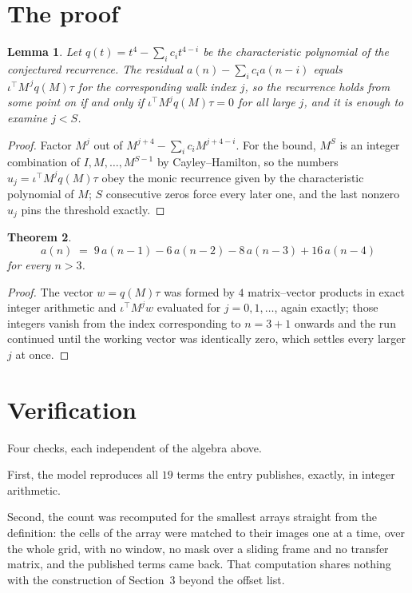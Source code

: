 \documentclass[11pt,a4paper]{article}
\theoremstyle{plain}
\newtheorem{theorem}{Theorem}
\newtheorem{lemma}[theorem]{Lemma}
\theoremstyle{definition}
\begin{document}
\section{The proof}

\begin{lemma}\label{lem:crit}
Let $q(t)=t^{4}-\sum_i c_it^{4-i}$ be the characteristic polynomial of the
conjectured recurrence. The residual $a(n)-\sum_ic_ia(n-i)$ equals
$\iota^{\!\top}M^{\,j}q(M)\tau$ for the corresponding walk index $j$, so the recurrence
holds from some point on if and only if $\iota^{\!\top}M^{j}q(M)\tau=0$ for all large $j$,
and it is enough to examine $j<S$.
\end{lemma}

\begin{proof}
Factor $M^{j}$ out of $M^{j+4}-\sum_ic_iM^{j+4-i}$. For the bound, $M^{S}$
is an integer combination of $I,M,\dots,M^{S-1}$ by Cayley--Hamilton, so the numbers
$u_j=\iota^{\!\top}M^{j}q(M)\tau$ obey the monic recurrence given by the characteristic
polynomial of $M$; $S$ consecutive zeros force every later one, and the last nonzero $u_j$
pins the threshold exactly.
\end{proof}

\begin{theorem}
\[
a(n)\;=\;9\,a(n-1) - 6\,a(n-2) - 8\,a(n-3) + 16\,a(n-4)
\]
for every $n>3$.
\end{theorem}

\begin{proof}
The vector $w=q(M)\tau$ was formed by $4$ matrix--vector products in exact integer
arithmetic and $\iota^{\!\top}M^{j}w$ evaluated for $j=0,1,\dots$, again exactly; those
integers vanish from the index corresponding to $n=3+1$ onwards and the run continued
until the working vector was identically zero, which settles every larger $j$ at once.
\end{proof}

\section{Verification}

Four checks, each independent of the algebra above.

First, the model reproduces all $19$ terms the entry publishes, exactly, in integer
arithmetic.

Second, the count was recomputed for the smallest arrays straight from the definition: the
cells of the array were matched to their images one at a time, over the whole grid, with no
window, no mask over a sliding frame and no transfer matrix, and the published terms came back.
That computation shares nothing with the construction of Section~3 beyond the offset list.
\end{document}
